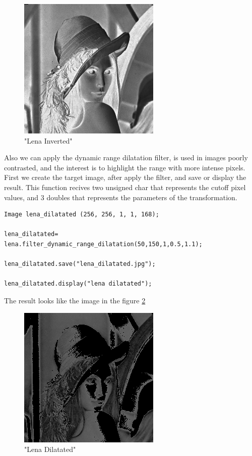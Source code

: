 \documentclass[a4paper]{article}
\begin{document}
\begin{figure}[H]

\centering
\includegraphics[scale=0.5]{./.Multimedia/lena_inverse.jpg}

\caption{"Lena Inverted"}
\label{lena_inverted}

\end{figure}

Also we can apply the dynamic range dilatation filter, is used in images poorly contrasted, and the interest is to highlight the range with more intense pixels. First we create the target image, after apply the filter, and save or display the result. This function recives two unsigned char that represents the cutoff pixel values, and 3 doubles that represents the parameters of the transformation.

\begin{lstlisting}
Image lena_dilatated (256, 256, 1, 1, 168);
	
lena_dilatated= lena.filter_dynamic_range_dilatation(50,150,1,0.5,1.1);
	
lena_dilatated.save("lena_dilatated.jpg");
	  
lena_dilatated.display("lena dilatated");
\end{lstlisting}

The result looks like the image in the figure \ref{lena_dilatated}

\begin{figure}[H]

\centering
\includegraphics[scale=0.5]{./.Multimedia/lena_dilatated.jpg}

\caption{"Lena Dilatated"}
\label{lena_dilatated}

\end{figure}
\end{document}
